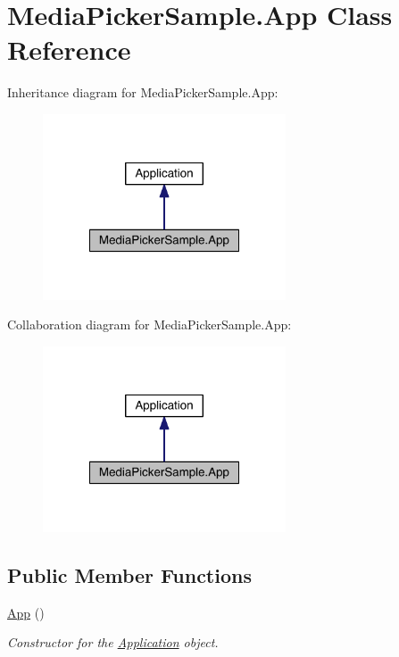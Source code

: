 \hypertarget{class_media_picker_sample_1_1_app}{\section{Media\+Picker\+Sample.\+App Class Reference}
\label{class_media_picker_sample_1_1_app}
}


Inheritance diagram for Media\+Picker\+Sample.\+App\+:
\nopagebreak
\begin{figure}[H]
\begin{center}
\leavevmode
\includegraphics[width=204pt]{class_media_picker_sample_1_1_app__inherit__graph}
\end{center}
\end{figure}


Collaboration diagram for Media\+Picker\+Sample.\+App\+:
\nopagebreak
\begin{figure}[H]
\begin{center}
\leavevmode
\includegraphics[width=204pt]{class_media_picker_sample_1_1_app__coll__graph}
\end{center}
\end{figure}
\subsection*{Public Member Functions}
\begin{DoxyCompactItemize}
\item 
\hyperlink{class_media_picker_sample_1_1_app_a2e667452542181281f4e68835c6034a5}{App} ()
\begin{DoxyCompactList}\small\item\em Constructor for the \hyperlink{class_media_picker_sample_1_1_application}{Application} object. \end{DoxyCompactList}\end{DoxyCompactItemize}
